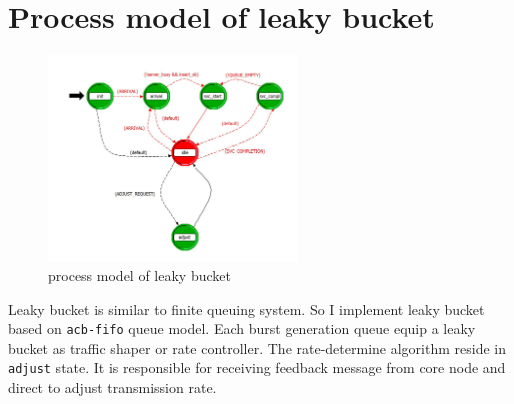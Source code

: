 \documentclass[oneside,12pt]{CUEDthesisPSnPDF}
\begin{document}
\renewcommand{\thepage}{\mbox{A-\arabic{page}}}
\renewcommand\thechapter{\Alph{chapter}}
\renewcommand{\chaptername}{Appendix}
\renewcommand{\thefigure}{A-\arabic{chapter}.\arabic{figure}}
\renewcommand{\thetable}{A-\arabic{chapter}.\arabic{table}}
\setcounter{page}{21}
\addtocounter{chapter}{1}

\chapter{Process model of leaky bucket}
\thispagestyle{fancy}
\begin{figure}[!htb]
\centering
\includegraphics[width=2.6in]{fig/lb}
\caption{process model of leaky bucket}
\label{fig:leaky_bucket}
\end{figure}

Leaky bucket is similar to finite queuing system. So I implement leaky bucket based on \verb|acb-fifo| queue model. Each burst generation queue equip a leaky bucket as traffic shaper or rate controller. The rate-determine algorithm reside in \verb|adjust| state. It is responsible for receiving feedback message from core node and direct to adjust transmission rate. 
\end{document}
